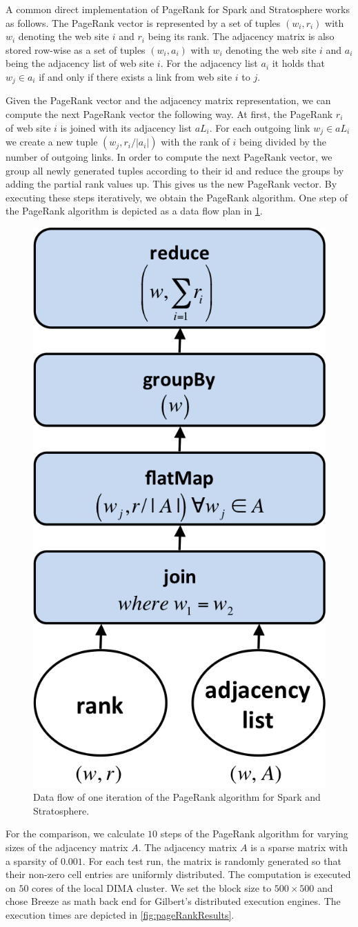 A common direct implementation of PageRank for Spark and Stratosphere works as follows.
The PageRank vector is represented by a set of tuples $(w_i, r_i)$ with $w_i$ denoting the web site $i$ and $r_i$ being its rank.
The adjacency matrix is also stored row-wise as a set of tuples $(w_i, a_i)$ with $w_i$ denoting the web site $i$ and $a_i$ being the adjacency list of web site $i$.
For the adjacency list $a_i$ it holds that $w_j \in a_i$ if and only if there exists a link from web site $i$ to $j$.

Given the PageRank vector and the adjacency matrix representation, we can compute the next PageRank vector the following way.
At first, the PageRank $r_i$ of web site $i$ is joined with its adjacency list $aL_i$.
For each outgoing link $w_j \in aL_i$ we create a new tuple $(w_j, r_i/\left|a_i\right|)$ with the rank of $i$ being divided by the number of outgoing links.
In order to compute the next PageRank vector, we group all newly generated tuples according to their id and reduce the groups by adding the partial rank values up.
This gives us the new PageRank vector.
By executing these steps iteratively, we obtain the PageRank algorithm.
One step of the PageRank algorithm is depicted as a data flow plan in \cref{fig:pageRankDataFlow}.

\begin{figure}
	\centering
	\includegraphics[width=.3\linewidth]{images/pageRankStep.png}
	\caption{Data flow of one iteration of the PageRank algorithm for Spark and Stratosphere.}
	\label{fig:pageRankDataFlow}
\end{figure}

For the comparison, we calculate $10$ steps of the PageRank algorithm for varying sizes of the adjacency matrix $A$.
The adjacency matrix $A$ is a sparse matrix with a sparsity of $0.001$.
For each test run, the matrix is randomly generated so that their non-zero cell entries are uniformly distributed.
The computation is executed on $50$ cores of the local DIMA cluster.
We set the block size to $500 \times 500$ and chose Breeze as math back end for Gilbert's distributed execution engines.
The execution times are depicted in \cref{fig:pageRankResults}.

